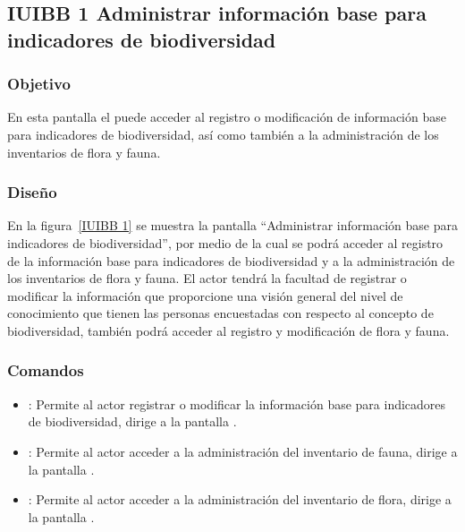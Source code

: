 \subsection{IUIBB 1 Administrar información base para indicadores de biodiversidad}

\subsubsection{Objetivo}
	
    En esta pantalla el  puede acceder al registro o modificación de información base para indicadores de biodiversidad, así como también a la administración de los inventarios de flora y fauna.

\subsubsection{Diseño}

    En la figura~\ref{IUIBB 1} se muestra la pantalla ``Administrar información base para indicadores de biodiversidad'', por medio de la cual se podrá acceder al registro de la información base para indicadores de biodiversidad y a la administración de los inventarios de flora y fauna. El actor tendrá la facultad de registrar o modificar la información que proporcione una visión general del nivel de conocimiento que tienen las personas encuestadas con respecto al concepto de biodiversidad, también podrá acceder al registro y modificación de flora y fauna.
    


\subsubsection{Comandos}
    \begin{itemize}
	\item {}: Permite al actor registrar o modificar la información base para indicadores de biodiversidad, dirige a la pantalla . 
	\item {}: Permite al actor acceder a la administración del inventario de fauna, dirige a la pantalla .
	\item {}: Permite al actor acceder a la administración del inventario de flora, dirige a la pantalla .
    \end{itemize}

